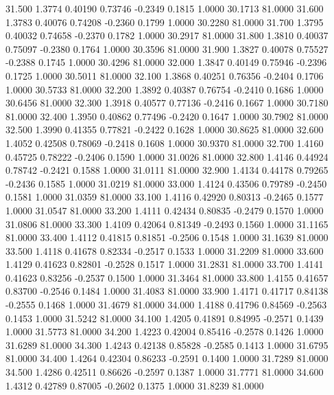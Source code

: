   31.500   1.3774   0.40190   0.73746  -0.2349   0.1815   1.0000  30.1713  81.0000
  31.600   1.3783   0.40076   0.74208  -0.2360   0.1799   1.0000  30.2280  81.0000
  31.700   1.3795   0.40032   0.74658  -0.2370   0.1782   1.0000  30.2917  81.0000
  31.800   1.3810   0.40037   0.75097  -0.2380   0.1764   1.0000  30.3596  81.0000
  31.900   1.3827   0.40078   0.75527  -0.2388   0.1745   1.0000  30.4296  81.0000
  32.000   1.3847   0.40149   0.75946  -0.2396   0.1725   1.0000  30.5011  81.0000
  32.100   1.3868   0.40251   0.76356  -0.2404   0.1706   1.0000  30.5733  81.0000
  32.200   1.3892   0.40387   0.76754  -0.2410   0.1686   1.0000  30.6456  81.0000
  32.300   1.3918   0.40577   0.77136  -0.2416   0.1667   1.0000  30.7180  81.0000
  32.400   1.3950   0.40862   0.77496  -0.2420   0.1647   1.0000  30.7902  81.0000
  32.500   1.3990   0.41355   0.77821  -0.2422   0.1628   1.0000  30.8625  81.0000
  32.600   1.4052   0.42508   0.78069  -0.2418   0.1608   1.0000  30.9370  81.0000
  32.700   1.4160   0.45725   0.78222  -0.2406   0.1590   1.0000  31.0026  81.0000
  32.800   1.4146   0.44924   0.78742  -0.2421   0.1588   1.0000  31.0111  81.0000
  32.900   1.4134   0.44178   0.79265  -0.2436   0.1585   1.0000  31.0219  81.0000
  33.000   1.4124   0.43506   0.79789  -0.2450   0.1581   1.0000  31.0359  81.0000
  33.100   1.4116   0.42920   0.80313  -0.2465   0.1577   1.0000  31.0547  81.0000
  33.200   1.4111   0.42434   0.80835  -0.2479   0.1570   1.0000  31.0806  81.0000
  33.300   1.4109   0.42064   0.81349  -0.2493   0.1560   1.0000  31.1165  81.0000
  33.400   1.4112   0.41815   0.81851  -0.2506   0.1548   1.0000  31.1639  81.0000
  33.500   1.4118   0.41678   0.82334  -0.2517   0.1533   1.0000  31.2209  81.0000
  33.600   1.4129   0.41623   0.82801  -0.2528   0.1517   1.0000  31.2831  81.0000
  33.700   1.4141   0.41623   0.83256  -0.2537   0.1500   1.0000  31.3464  81.0000
  33.800   1.4155   0.41657   0.83700  -0.2546   0.1484   1.0000  31.4083  81.0000
  33.900   1.4171   0.41717   0.84138  -0.2555   0.1468   1.0000  31.4679  81.0000
  34.000   1.4188   0.41796   0.84569  -0.2563   0.1453   1.0000  31.5242  81.0000
  34.100   1.4205   0.41891   0.84995  -0.2571   0.1439   1.0000  31.5773  81.0000
  34.200   1.4223   0.42004   0.85416  -0.2578   0.1426   1.0000  31.6289  81.0000
  34.300   1.4243   0.42138   0.85828  -0.2585   0.1413   1.0000  31.6795  81.0000
  34.400   1.4264   0.42304   0.86233  -0.2591   0.1400   1.0000  31.7289  81.0000
  34.500   1.4286   0.42511   0.86626  -0.2597   0.1387   1.0000  31.7771  81.0000
  34.600   1.4312   0.42789   0.87005  -0.2602   0.1375   1.0000  31.8239  81.0000
